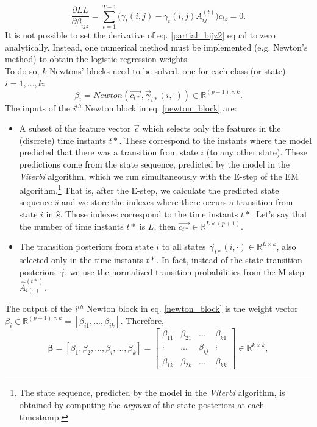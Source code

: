 \documentclass{article}
\begin{document}
\begin{equation}
    \dfrac{\partial LL}{\partial \beta_{ijz}} =\sum_{t=1}^{T-1} \Bigg(\gamma_t(i,j) -  \gamma_t(i,j) A_{ij}^{(t)} \Bigg)c_{tz} = 0.
    \label{partial_bijz2}
\end{equation}
It is not possible to set the derivative  of eq. \eqref{partial_bijz2} equal to zero analytically. Instead, one numerical method must be implemented (e.g. Newton's method) to obtain the logistic regression weights. \\ \noindent
To do so, $k$ Newtons' blocks need to be solved, one for each class (or state) $i=1,...,k$:
\begin{equation}
    \beta_i = Newton(\Vec{c_{t*}}, \Vec{\gamma}_{t*}(i, \cdot)) \in \mathbb{R}^{(p+1) \times k}.
    \label{newton_block}
\end{equation}
The inputs of the $i^{th}$ Newton block in eq. \eqref{newton_block} are: 
\begin{itemize}
    \item A subset of the feature vector $\Vec{c}$ which selects only the features in the (discrete) time instants $t*$. These correspond to the instants where the model predicted that there was a transition from state $i$ (to any other state). These predictions come from the state sequence, predicted by the model in the \textit{Viterbi} algorithm, which we run simultaneously with the E-step of the EM algorithm.\footnote{The state sequence, predicted by the model in the \textit{Viterbi} algorithm, is obtained by computing the \textit{argmax} of the state posteriors at each timestamp.}
    That is, after the E-step, we calculate the predicted state sequence $\hat{s}$ and we store the indexes where there occurs a transition from state $i$ in $\hat{s}$. Those indexes correspond to the time instants $t*$. Let's say that the number of time instants $t*$ is $L$, then $\Vec{c_{t*}}\in \mathbb{R}^{L \times (p+1)}$.
    \item The transition posteriors from state $i$ to all states $\Vec{\gamma}_{t*}(i, \cdot) \in \mathbb{R}^{L \times k}$, also selected only in the time instants $t*$. In fact, instead of the state transition posteriors $\Vec{\gamma}$, we use the normalized transition probabilities from the M-step $\hat{A}_{i(\cdot)}^{(t*)}$.
\end{itemize}The output of the $i^{th}$ Newton block in eq. \eqref{newton_block} is the weight vector $\beta_i \in \mathbb{R}^{(p+1)\times k} = [\beta_{i1},...,\beta_{ik}]$. Therefore,
\begin{equation}
    \boldsymbol{\beta} = [\beta_1, \beta_2,...,\beta_i,...,\beta_k] = \begin{bmatrix}
    \beta_{11} & \beta_{21} & ... & \beta_{k1}\\
    \vdots & ... & \beta_{ij} & \vdots\\
    \beta_{1k} & \beta_{2k} & ... & \beta_{kk}
        
    \end{bmatrix} \in \mathbb{R}^{k\times k},
\end{equation}
\end{document}
